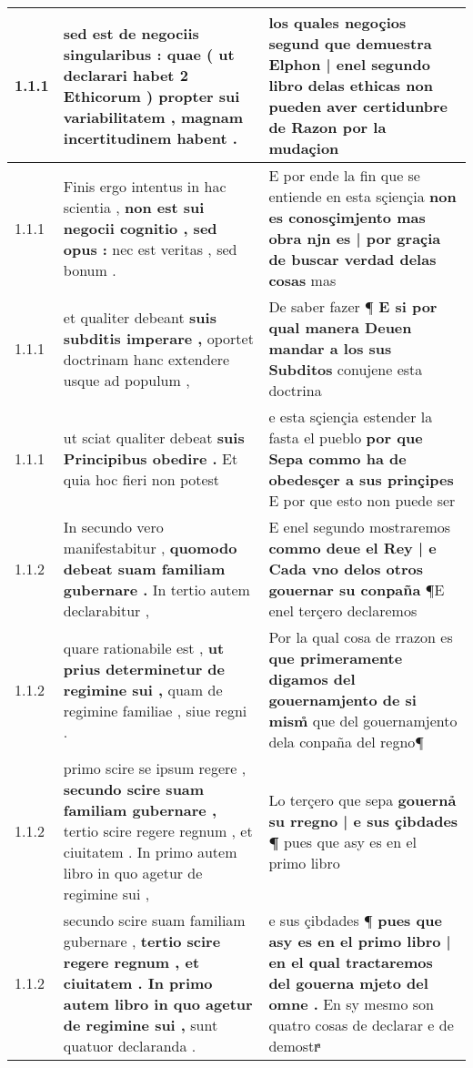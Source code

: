 \begin{tabular}{|p{1cm}|p{6.5cm}|p{6.5cm}|}

\hline
1.1.1 & sed est de negociis singularibus : \textbf{ quae ( ut declarari habet 2 Ethicorum ) propter sui variabilitatem , } magnam incertitudinem habent . & los quales negoçios segund \textbf{ que demuestra Elphon | enel segundo libro delas ethicas non pueden aver certidunbre de Razon } por la mudaçion \\\hline
1.1.1 & Finis ergo intentus in hac scientia , \textbf{ non est sui negocii cognitio , sed opus : } nec est veritas , sed bonum . & E por ende la fin que se entiende en esta sçiençia \textbf{ non es conosçimjento mas obra njn es | por graçia de buscar verdad delas cosas } mas \\\hline
1.1.1 & et qualiter debeant \textbf{ suis subditis imperare , } oportet doctrinam hanc extendere usque ad populum , & De saber fazer ¶ \textbf{ E si por qual manera Deuen mandar a los sus Subditos } conujene esta doctrina \\\hline
1.1.1 & ut sciat qualiter debeat \textbf{ suis Principibus obedire . } Et quia hoc fieri non potest & e esta sçiençia estender la fasta el pueblo \textbf{ por que Sepa commo ha de obedesçer a sus prinçipes } E por que esto non puede ser \\\hline
1.1.2 & In secundo vero manifestabitur , \textbf{ quomodo debeat suam familiam gubernare . } In tertio autem declarabitur , & E enel segundo mostraremos \textbf{ commo deue el Rey | e Cada vno delos otros gouernar su conpaña } ¶E enel terçero declaremos \\\hline
1.1.2 & quare rationabile est , \textbf{ ut prius determinetur de regimine sui , } quam de regimine familiae , siue regni . & Por la qual cosa de rrazon es \textbf{ que primeramente digamos del gouernamjento de si mism̊ } que del gouernamjento dela conpaña del regno¶ \\\hline
1.1.2 & primo scire se ipsum regere , \textbf{ secundo scire suam familiam gubernare , } tertio scire regere regnum , et ciuitatem . In primo autem libro in quo agetur de regimine sui , & Lo terçero que sepa \textbf{ gouernả su rregno | e sus çibdades ¶ } pues que asy es en el primo libro \\\hline
1.1.2 & secundo scire suam familiam gubernare , \textbf{ tertio scire regere regnum , et ciuitatem . In primo autem libro in quo agetur de regimine sui , } sunt quatuor declaranda . & e sus çibdades ¶ \textbf{ pues que asy es en el primo libro | en el qual tractaremos del gouerna mjeto del omne . } En sy mesmo son quatro cosas de declarar e de demostrͣ \\\hline

\end{tabular}
